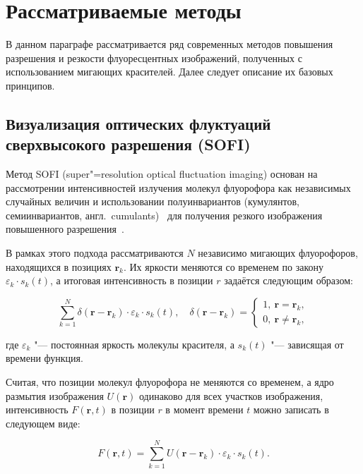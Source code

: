 \section{Рассматриваемые методы}

В данном параграфе рассматривается ряд современных методов повышения разрешения и резкости флуоресцентных изображений, полученных с использованием мигающих красителей. Далее следует описание их базовых принципов.

\subsection{Визуализация оптических флуктуаций сверхвысокого разрешения (SOFI)}

Метод SOFI (super"=resolution optical fluctuation imaging) основан на рассмотрении интенсивностей излучения молекул флуорофора как независимых случайных величин и использовании полуинвариантов (кумулянтов, семиинвариантов, англ.~cumulants)~\cite{75086, малахов1978кумулянтный} для получения резкого изображения повышенного разрешения~\cite{dertinger2009fast,dertinger2010achieving}.

В рамках этого подхода рассматриваются $N$ независимо мигающих флуорофоров, находящихся в позициях $\mathbf{r}_k$. Их яркости меняются со временем по закону $\varepsilon_k\cdot s_k(t)$, а итоговая интенсивность в позиции $r$ задаётся следующим образом:

\begin{equation}
	\sum_{k=1}^{N}{\delta(\mathbf{r}-\mathbf{r}_k)\cdot\varepsilon_k\cdot s_k(t)}, \quad \delta\left(\mathbf{r}-\mathbf{r}_k\right)=
	\begin{cases}
		1,\ \mathbf{r}=\mathbf{r}_k, \\
		0,\ \mathbf{r}\neq\mathbf{r}_k,
	\end{cases} \nonumber
\end{equation}	

\noindent где $\varepsilon_k$ "--- постоянная яркость молекулы красителя, а $s_k(t)$ "--- зависящая от времени функция.

Считая, что позиции молекул флуорофора не меняются со временем, а ядро размытия изображения $U(\mathbf{r})$ одинаково для всех участков изображения, интенсивность $F(\mathbf{r},t)$ в позиции $r$ в момент времени $t$ можно записать в следующем виде:

\begin{equation}
	F\left(\mathbf{r},t\right)=\sum_{k=1}^{N}{U(\mathbf{r}-\mathbf{r}_k)\cdot\varepsilon_k\cdot s_k(t)}. \nonumber
\end{equation}

